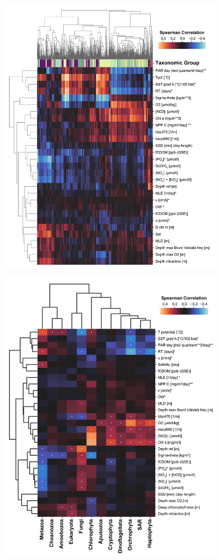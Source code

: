 \documentclass[12pt]{article}
\numberwithin{equation}{section}
\begin{document}
\begin{figure}
    \centering
    \includegraphics[width=0.9\columnwidth]{si-figures/modified-individual-mag-group-correlation-01.png}
    \caption{ }
    \label{fig:ind-corr}
\end{figure}


\begin{figure}
    \centering
    \includegraphics[width=0.9\columnwidth]{si-figures/mag-group-correlation-01.png}
    \caption{ }
    \label{fig:env-corr}
\end{figure}
\end{document}

